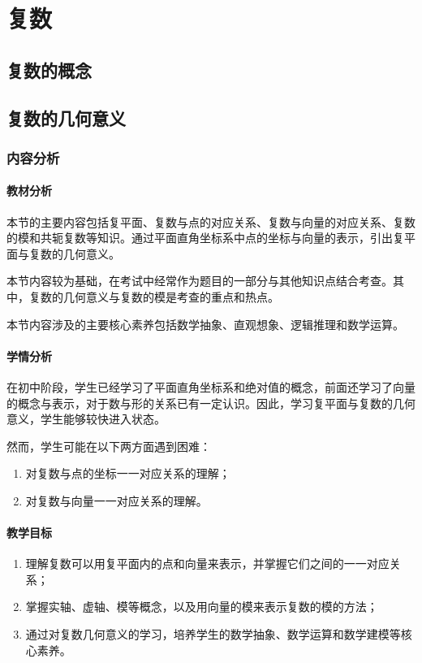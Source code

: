 \chapter{复数}
\section{复数的概念}
\newpage
\section{复数的几何意义}
\subsection{内容分析}
\subsubsection{教材分析}
本节的主要内容包括复平面、复数与点的对应关系、复数与向量的对应关系、复数的模和共轭复数等知识。通过平面直角坐标系中点的坐标与向量的表示，引出复平面与复数的几何意义。

本节内容较为基础，在考试中经常作为题目的一部分与其他知识点结合考查。其中，复数的几何意义与复数的模是考查的重点和热点。

本节内容涉及的主要核心素养包括数学抽象、直观想象、逻辑推理和数学运算。

\subsubsection{学情分析}
在初中阶段，学生已经学习了平面直角坐标系和绝对值的概念，前面还学习了向量的概念与表示，对于数与形的关系已有一定认识。因此，学习复平面与复数的几何意义，学生能够较快进入状态。

然而，学生可能在以下两方面遇到困难：
\begin{enumerate}
    \item 对复数与点的坐标一一对应关系的理解；
    \item 对复数与向量一一对应关系的理解。
\end{enumerate}

\subsubsection{教学目标}
\begin{enumerate}
    \item 理解复数可以用复平面内的点和向量来表示，并掌握它们之间的一一对应关系；
    \item 掌握实轴、虚轴、模等概念，以及用向量的模来表示复数的模的方法；
    \item 通过对复数几何意义的学习，培养学生的数学抽象、数学运算和数学建模等核心素养。
\end{enumerate}

